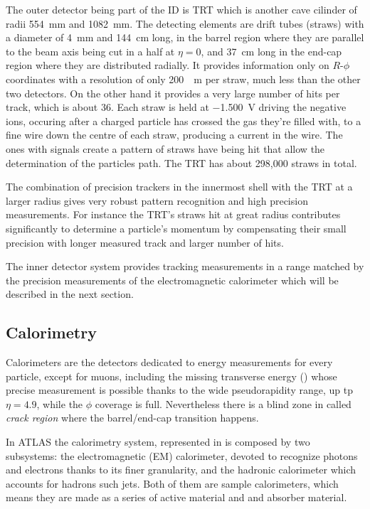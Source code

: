 The outer detector being part of the ID is TRT which is another cave cilinder of radii \SI{554}{mm} and \SI{1082}{mm}. The detecting elements are drift tubes (straws) with a diameter of \SI{4}{mm} and \SI{144}{cm} long, in the barrel region where they are parallel to the beam axis being cut in a half at $\eta =0$, and \SI{37}{cm} long in the end-cap region where they are distributed radially. It provides information only on $R$-$\phi$ coordinates with a resolution of  only \SI{200}{\mu m} per straw, much less than the other two detectors. On the other hand it provides a very large number of hits per track, which is about \num{36}. Each straw is held at \SI{-1.500}{V} driving the negative ions, occuring after a charged particle has crossed the gas they're filled with, to a fine wire down the centre of each straw, producing a current in the wire. The ones with signals create a pattern of straws have being hit that allow the determination of the particles path. The TRT has about 298,000 straws in total.

The combination of precision trackers in the innermost shell with the TRT at a larger radius gives very robust pattern recognition and high precision measurements. For instance the TRT's straws hit at great radius contributes significantly to determine a particle's momentum by compensating their small precision with longer measured track and larger number of hits.

The inner detector system provides tracking measurements in a range matched by the precision measurements of the electromagnetic calorimeter which will be described in the next section.

\subsection{Calorimetry}
\label{sec:calo}
Calorimeters are the detectors dedicated to energy measurements for every particle, except for muons, including the missing transverse energy (\met) whose precise measurement is possible thanks to the wide pseudorapidity range, up tp $\eta=4.9$, while the $\phi$ coverage is full. Nevertheless there is a blind zone in  called \emph{crack region} where the barrel/end-cap transition happens.

In ATLAS the calorimetry system, represented in \Fig{\ref{fig:Calos}} is composed by two subsystems: the electromagnetic (EM) calorimeter, devoted to recognize photons and electrons thanks to its finer granularity, and the hadronic calorimeter which accounts for hadrons such jets. Both of them are sample calorimeters, which means they are made as a series of active material and and absorber material.

